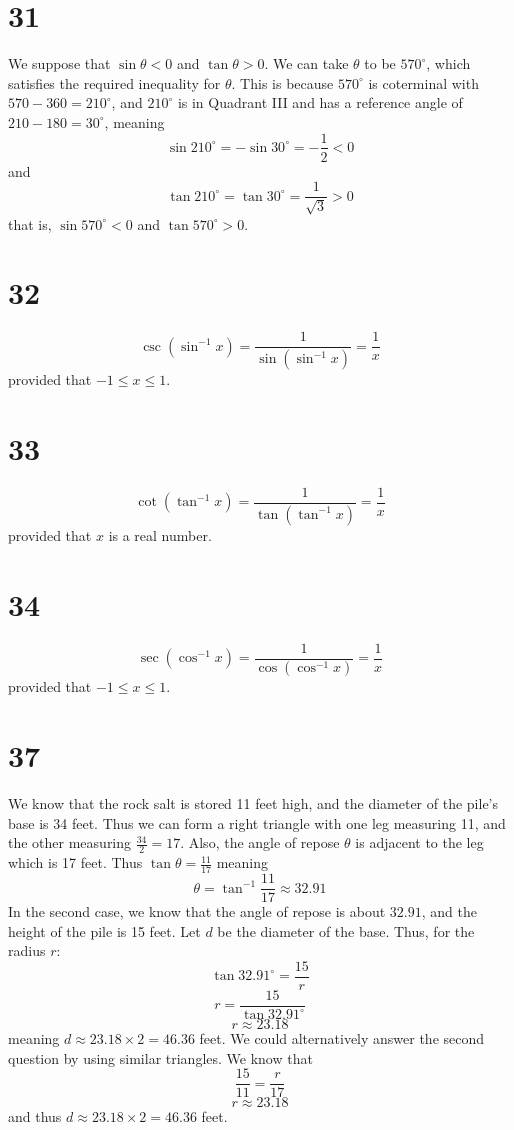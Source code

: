 \documentclass{article}
\theoremstyle{definition}
\newcommand{\?}{\stackrel{?}{=}}
\begin{document}
\section*{31}
We suppose that $\sin\theta<0$ and $\tan\theta>0$. We can take $\theta$ to be $570^\circ$, which satisfies the required inequality for $\theta$. This is 
because $570^\circ$ is coterminal with $570-360=210^\circ$, and $210^\circ$ is in Quadrant III and has a reference angle of $210-180=30^\circ$, meaning
\[ \sin 210^\circ=-\sin 30^\circ=-\frac{1}{2}<0 \] and \[ \tan 210^\circ=\tan 30^\circ=\frac{1}{\sqrt{3}}>0 \]
that is, $\sin 570^\circ<0$ and $\tan 570^\circ>0$.

\section*{32}
\[ \csc\left(\sin^{-1}x\right)=\dfrac{1}{\sin\left(\sin^{-1}x\right)}=\frac{1}{x} \] provided that 
$-1\le x\le 1$.

\section*{33}
\[ \cot\left(\tan^{-1}x\right)=\dfrac{1}{\tan\left(\tan^{-1}x\right)}=\dfrac{1}{x} \] provided that $x$ is a real number.

\section*{34}
\[ \sec\left(\cos^{-1}x\right)=\dfrac{1}{\cos\left(\cos^{-1}x\right)}=\dfrac{1}{x} \] provided that $-1\le x\le 1$. 

\section*{37}
We know that the rock salt is stored 11 feet high, and the diameter of the pile's base is 34 feet. Thus we can form a right triangle with one leg measuring 11, and the 
other measuring $\frac{34}{2}=17$. Also, the angle of repose $\theta$ is adjacent to the leg which is 17 feet. Thus $\tan\theta=\frac{11}{17}$ meaning
\[ \theta=\tan^{-1}\frac{11}{17}\approx 32.91 \] In the second case, we know that the angle of repose is about $32.91$, and the height of the pile is 15 feet. Let 
$d$ be the diameter of the base. Thus, for the radius $r$:
\[ \tan 32.91^\circ=\frac{15}{r} \]
\[ r=\frac{15}{\tan 32.91^\circ} \]
\[ r\approx 23.18 \]
meaning $d\approx 23.18\times 2=46.36$ feet. We could alternatively answer the second question by using similar triangles. We know that
\[ \frac{15}{11}=\frac{r}{17} \]
\[ r\approx 23.18 \]
and thus $d\approx 23.18\times 2=46.36$ feet.
\end{document}
